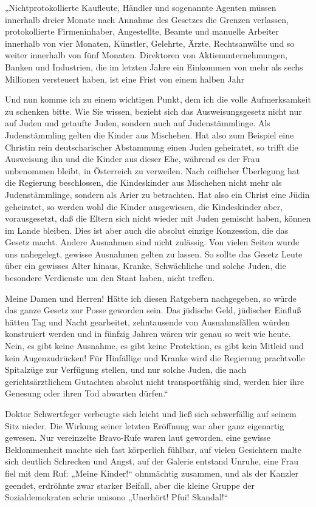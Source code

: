 „Nichtprotokollierte Kaufleute, Händler und sogenannte Agenten
müssen innerhalb dreier Monate nach Annahme des Gesetzes die
Grenzen verlassen, protokollierte Firmeninhaber, Angestellte,
Beamte und manuelle Arbeiter innerhalb von vier Monaten, Künstler,
Gelehrte, Ärzte, Rechtsanwälte und so weiter innerhalb von fünf
Monaten. Direktoren von Aktienunternehmungen, Banken und
Industrien, die im letzten Jahre ein Einkommen von mehr als sechs
Millionen versteuert haben, ist eine Frist von einem halben Jahr

Und nun komme ich zu einem wichtigen Punkt, dem ich die volle
Aufmerksamkeit zu schenken bitte. Wie Sie wissen, bezieht sich das
Ausweisungsgesetz nicht nur auf Juden und getaufte Juden, sondern
auch auf Judenstämmlinge. Als Judenstämmling gelten die Kinder aus
Mischehen. Hat also zum Beispiel eine Christin rein deutscharischer
Abstammung einen Juden geheiratet, so trifft die Ausweisung ihn und
die Kinder aus dieser Ehe, während es  der Frau
unbenommen bleibt, in Österreich zu verweilen. Nach reiflicher
Überlegung hat die Regierung beschlossen, die Kindeskinder aus
Mischehen nicht mehr als Judenstämmlinge, sondern als Arier zu
betrachten. Hat also ein Christ eine Jüdin geheiratet, so werden
wohl die Kinder ausgewiesen, die Kindeskinder aber, vorausgesetzt,
daß die Eltern sich nicht wieder mit Juden gemischt haben, können
im Lande bleiben. Dies ist aber auch die absolut einzige
Konzession, die das Gesetz macht. Andere Ausnahmen sind nicht
zulässig. Von vielen Seiten wurde uns nahegelegt, gewisse Ausnahmen
gelten zu lassen. So sollte das Gesetz Leute über ein gewisses
Alter hinaus, Kranke, Schwächliche und solche Juden, die besondere
Verdienste um den Staat haben, nicht treffen.

Meine Damen und Herren! Hätte ich diesen Ratgebern nachgegeben, so
würde das ganze Gesetz zur Posse geworden sein. Das jüdische Geld,
jüdischer Einfluß hätten Tag und Nacht gearbeitet, zehntausende von
Ausnahmsfällen würden konstruiert werden und in fünfzig Jahren
wären wir genau so weit wie heute. Nein, es gibt keine Ausnahme, es
gibt keine Protektion, es gibt kein Mitleid und kein
Augenzudrücken! Für Hinfällige und Kranke wird die Regierung
prachtvolle Spitalzüge zur Verfügung stellen, und nur solche Juden,
die nach gerichtsärztlichem Gutachten absolut nicht transportfähig
sind, werden hier ihre Genesung oder ihren Tod abwarten dürfen.“

Doktor Schwertfeger verbeugte sich leicht und ließ sich
schwerfällig auf seinem Sitz nieder. Die Wirkung seiner letzten
Eröffnung war aber ganz eigenartig gewesen.  Nur
vereinzelte Bravo-Rufe waren laut geworden, eine gewisse
Beklommenheit machte sich fast körperlich fühlbar, auf vielen
Gesichtern malte sich deutlich Schrecken und Angst, auf der Galerie
entstand Unruhe, eine Frau fiel mit dem Ruf: „Meine Kinder!“
ohnmächtig zusammen, und als der Kanzler geendet, erdröhnte zwar
starker Beifall, aber die kleine Gruppe der Sozialdemokraten schrie
unisono „Unerhört! Pfui! Skandal!“

